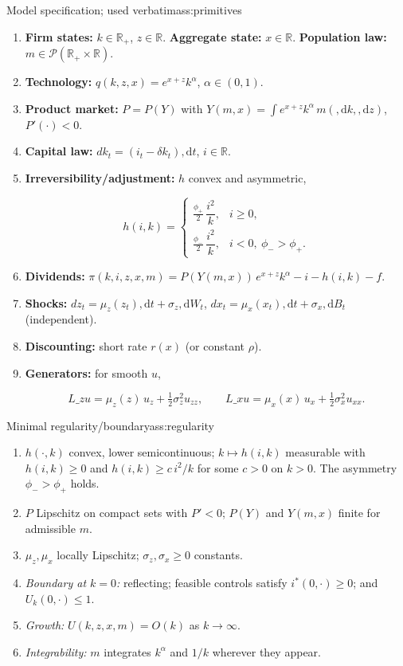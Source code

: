 \documentclass[11pt,letterpaper,oneside]{article}
\numberwithin{equation}{section}
\newcommand{\R}{\mathbb{R}}
\newcommand{\1}{\mathbf{1}}
\newcommand{\diff}{,\mathrm{d}}
\newcommand{\Lz}{L\_z}
\newcommand{\Lx}{L\_x}
\newcommand{\YY}{Y(m,x)}
\begin{document}
\begin{assumption}{Model specification; used verbatim}{ass:primitives}
\begin{enumerate}[label=(\roman*),itemsep=0.25em]
\item \textbf{Firm states:} $k\in\R_+$, $z\in\R$. \textbf{Aggregate state:} $x\in\R$. \textbf{Population law:} $m\in\mathcal P(\R_+\times\R)$.
\item \textbf{Technology:} $q(k,z,x)=e^{x+z}k^\alpha$, $\alpha\in(0,1)$.
\item \textbf{Product market:} $P=P(Y)$ with $Y(m,x)=\int e^{x+z}k^\alpha\, m(\diff k,\diff z)$, $P'(\cdot)<0$.
\item \textbf{Capital law:} $dk_t=(i_t-\delta k_t)\diff t$, $i\in\R$.
\item \textbf{Irreversibility/adjustment:} $h$ convex and asymmetric,

$$
h(i,k)=
\begin{cases}
\tfrac{\phi_+}{2}\,\dfrac{i^2}{k}, & i\ge 0,\\[3pt]
\tfrac{\phi_-}{2}\,\dfrac{i^2}{k}, & i<0,\ \phi_->\phi_+.
\end{cases}
$$

\item \textbf{Dividends:} $\pi(k,i,z,x,m)=P(\YY)\,e^{x+z}k^\alpha - i - h(i,k) - f$.
\item \textbf{Shocks:} $dz_t=\mu_z(z_t)\diff t+\sigma_z\diff W_t$, $dx_t=\mu_x(x_t)\diff t+\sigma_x\diff B_t$ (independent).
\item \textbf{Discounting:} short rate $r(x)$ (or constant $\rho$).
\item \textbf{Generators:} for smooth $u$,

$$
\Lz u=\mu_z(z)\,u_z+\tfrac12\sigma_z^2 u_{zz},\qquad
\Lx u=\mu_x(x)\,u_x+\tfrac12\sigma_x^2 u_{xx}.
$$

\end{enumerate}
\end{assumption}

\begin{assumption}{Minimal regularity/boundary}{ass:regularity}
\begin{enumerate}[label=(\alph*),itemsep=0.2em]
\item $h(\cdot,k)$ convex, lower semicontinuous; $k\mapsto h(i,k)$ measurable with $h(i,k)\ge 0$ and $h(i,k)\ge c\,i^2/k$ for some $c>0$ on $k>0$. The asymmetry $\phi_->\phi_+$ holds.
\item $P$ Lipschitz on compact sets with $P'<0$; $P(Y)$ and $Y(m,x)$ finite for admissible $m$.
\item $\mu_z,\mu_x$ locally Lipschitz; $\sigma_z,\sigma_x\ge 0$ constants.
\item \emph{Boundary at $k=0$:} reflecting; feasible controls satisfy $i^*(0,\cdot)\ge 0$; and $U_k(0,\cdot)\le 1$.
\item \emph{Growth:} $U(k,z,x,m)=O(k)$ as $k\to\infty$.
\item \emph{Integrability:} $m$ integrates $k^\alpha$ and $1/k$ wherever they appear.
\end{enumerate}
\end{assumption}
\end{document}
